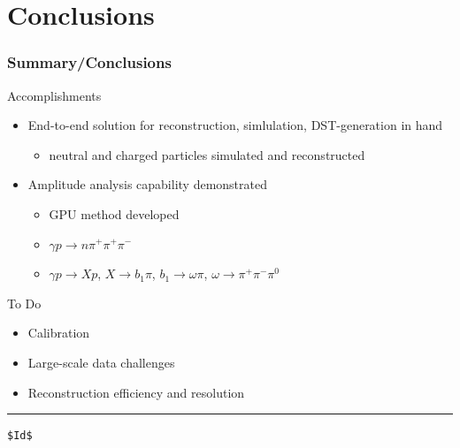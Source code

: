 \documentclass[xcolor=dvipsnames,hyperref={pdfpagelabels=false}]{beamer}
\newcommand{\bi}{\begin{itemize}}
\newcommand{\ei}{\end{itemize}}
\newcommand{\I}{\item}
\newcommand{\ft}{\frametitle}
\begin{document}
\section{Conclusions}


\begin{frame}[fragile]
\ft{Summary/Conclusions}
Accomplishments
\bi
\I End-to-end solution for reconstruction, simlulation, DST-generation in hand
   \bi
   \I neutral and charged particles simulated and reconstructed
   \ei
\I Amplitude analysis capability demonstrated
   \bi
   \I GPU method developed
   \I $\gamma p \rightarrow n\pi^+\pi^+\pi^-$
   \I $\gamma p \rightarrow Xp$, $X \rightarrow b_1\pi$, $b_1 \rightarrow \omega\pi$, $\omega\rightarrow\pi^+\pi^-\pi^0$
   \ei
\ei
To Do
\bi
\I Calibration
\I Large-scale data challenges
\I Reconstruction efficiency and resolution
\ei

\vskip 0.5in
\hrule
\tiny
\begin{verbatim}
$Id$
\end{verbatim}
\end{frame}
\end{document}
